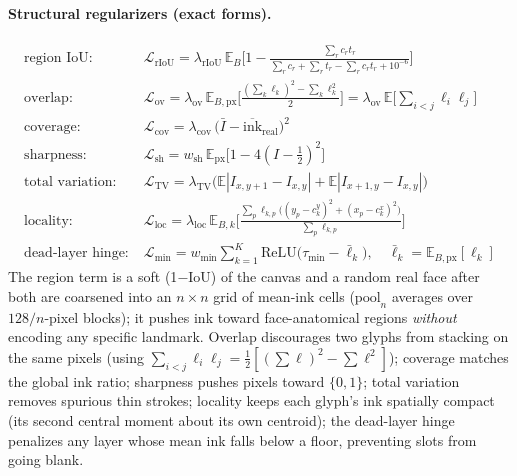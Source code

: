 \documentclass{article}
\newcommand{\real}{\mathrm{real}}
\begin{document}
\paragraph{Structural regularizers (exact forms).}
\begin{align}
\text{region IoU:}\;
&\mathcal{L}_{\mathrm{rIoU}} = \lambda_{\mathrm{rIoU}}\,\mathbb{E}_B\!\Big[1-\tfrac{\sum_r c_r t_r}{\sum_r c_r+\sum_r t_r-\sum_r c_r t_r+10^{-6}}\Big]\\
\text{overlap:}\;
&\mathcal{L}_{\mathrm{ov}} = \lambda_{\mathrm{ov}}\,\mathbb{E}_{B,\mathrm{px}}\!\Big[\tfrac{(\sum_k\ell_k)^2-\sum_k\ell_k^2}{2}\Big]=\lambda_{\mathrm{ov}}\,\mathbb{E}\big[\textstyle\sum_{i<j}\ell_i\ell_j\big]\\
\text{coverage:}\;
&\mathcal{L}_{\mathrm{cov}} = \lambda_{\mathrm{cov}}\,\big(\bar I-\overline{\mathrm{ink}}_\real\big)^2\\
\text{sharpness:}\;
&\mathcal{L}_{\mathrm{sh}} = w_{\mathrm{sh}}\,\mathbb{E}_{\mathrm{px}}\!\big[1-4(I-\tfrac12)^2\big]\\
\text{total variation:}\;
&\mathcal{L}_{\mathrm{TV}} = \lambda_{\mathrm{TV}}\big(\mathbb{E}|I_{x,y+1}-I_{x,y}|+\mathbb{E}|I_{x+1,y}-I_{x,y}|\big)\\
\text{locality:}\;
&\mathcal{L}_{\mathrm{loc}} = \lambda_{\mathrm{loc}}\,\mathbb{E}_{B,k}\!\Big[\tfrac{\sum_p\ell_{k,p}\big((y_p-c^y_k)^2+(x_p-c^x_k)^2\big)}{\sum_p\ell_{k,p}}\Big]\\
\text{dead-layer hinge:}\;
&\mathcal{L}_{\mathrm{min}} = w_{\mathrm{min}}\textstyle\sum_{k=1}^{K}\mathrm{ReLU}\big(\tau_{\min}-\bar\ell_k\big),\quad \bar\ell_k=\mathbb{E}_{B,\mathrm{px}}[\ell_k]
\end{align}
The region term is a soft (1$-$IoU) of the canvas and a random real face after both are coarsened into
an $n{\times}n$ grid of mean-ink cells ($\mathrm{pool}_n$ averages over $128/n$-pixel blocks); it pushes
ink toward face-anatomical regions \emph{without} encoding any specific landmark. Overlap discourages
two glyphs from stacking on the same pixels (using
$\sum_{i<j}\ell_i\ell_j=\tfrac12[(\sum\ell)^2-\sum\ell^2]$); coverage matches the global ink ratio;
sharpness pushes pixels toward $\{0,1\}$; total variation removes spurious thin strokes; locality keeps
each glyph's ink spatially compact (its second central moment about its own centroid); the dead-layer
hinge penalizes any layer whose mean ink falls below a floor, preventing slots from going blank.
\end{document}
